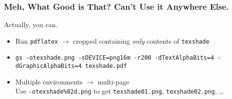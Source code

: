 \begin{frame}[fragile]
\frametitle{Meh, What Good is That? Can't Use it Anywhere Else.}
Actually, you can.

\bigskip

\pause
{}

\begin{itemize}
\item Run \texttt{pdflatex} $\rightarrow$ cropped  containing \emph{only} contents of \texttt{texshade}
\pause
\item \texttt{gs -otexshade.png -sDEVICE=png16m -r200 -dTextAlphaBits=4 -dGraphicAlphaBits=4 texshade.pdf}
\pause
\item Multiple environments $\rightarrow$ multi-page \\Use \verb|-otexshade%02d.png| to get \texttt{texshade01.png}, \texttt{texshade02.png}, \ldots
\end{itemize}
\end{frame}


